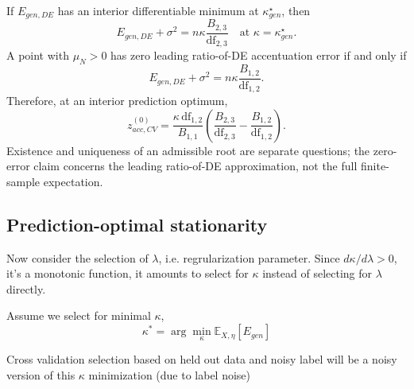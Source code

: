 \begingroup\color{red}
\begin{proposition}
\label{prop:app-prediction-control-optima}
If $E_{gen,DE}$ has an interior differentiable minimum at
$\kappa_{gen}^\star$, then
\begin{equation}
E_{gen,DE}+\sigma^2
=n\kappa\frac{B_{2,3}}{\mathrm{df}_{2,3}}
\quad\text{at }\kappa=\kappa_{gen}^\star.
\end{equation}
A point with $\mu_N>0$ has zero leading ratio-of-DE accentuation error if
and only if
\begin{equation}
E_{gen,DE}+\sigma^2
=n\kappa\frac{B_{1,2}}{\mathrm{df}_{1,2}}.
\end{equation}
Therefore, at an interior prediction optimum,
\begin{equation}
z_{acc,CV}^{(0)}
=\frac{\kappa\,\mathrm{df}_{1,2}}{B_{1,1}}
\left(\frac{B_{2,3}}{\mathrm{df}_{2,3}}
-\frac{B_{1,2}}{\mathrm{df}_{1,2}}\right).
\label{eq:app-zacc-cv-summary}
\end{equation}
Existence and uniqueness of an admissible root are separate questions; the
zero-error claim concerns the leading ratio-of-DE approximation, not the full
finite-sample expectation.
\end{proposition}
\endgroup

\subsection{Prediction-optimal stationarity}

Now consider the selection of $\lambda$, i.e. regrularization parameter.
Since $d\kappa/d\lambda>0$, it's a monotonic function, it amounts
to select for $\kappa$ instead of selecting for $\lambda$ directly.

Assume we select for minimal $\kappa$,
\[
\kappa^{*}=\arg\min_{\kappa}\mathbb{E}_{X,\eta}[E_{gen}]
\]

Cross validation selection based on held out data and noisy label
will be a noisy version of this $\kappa$ minimization (due to label
noise)

